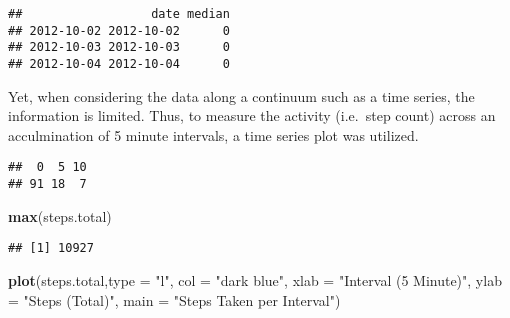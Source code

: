 \documentclass[]{article}
\newenvironment{Shaded}{\begin{snugshade}}{\end{snugshade}}
\newcommand{\KeywordTok}[1]{\textcolor[rgb]{0.13,0.29,0.53}{\textbf{#1}}}
\newcommand{\DataTypeTok}[1]{\textcolor[rgb]{0.13,0.29,0.53}{#1}}
\newcommand{\DecValTok}[1]{\textcolor[rgb]{0.00,0.00,0.81}{#1}}
\newcommand{\StringTok}[1]{\textcolor[rgb]{0.31,0.60,0.02}{#1}}
\newcommand{\OperatorTok}[1]{\textcolor[rgb]{0.81,0.36,0.00}{\textbf{#1}}}
\newcommand{\NormalTok}[1]{#1}
\begin{document}
\begin{verbatim}
##                  date median
## 2012-10-02 2012-10-02      0
## 2012-10-03 2012-10-03      0
## 2012-10-04 2012-10-04      0
\end{verbatim}

\begin{Shaded}
\end{Shaded}

Yet, when considering the data along a continuum such as a time series,
the information is limited. Thus, to measure the activity (i.e.~step
count) across an acculmination of 5 minute intervals, a time series plot
was utilized.

\begin{Shaded}
\end{Shaded}

\begin{verbatim}
##  0  5 10 
## 91 18  7
\end{verbatim}

\begin{Shaded}
\begin{Highlighting}[]
\KeywordTok{max}\NormalTok{(steps.total)}
\end{Highlighting}
\end{Shaded}

\begin{verbatim}
## [1] 10927
\end{verbatim}

\begin{Shaded}
\begin{Highlighting}[]
\KeywordTok{plot}\NormalTok{(steps.total,}\DataTypeTok{type  =} \StringTok{"l"}\NormalTok{, }\DataTypeTok{col =} \StringTok{"dark blue"}\NormalTok{, }\DataTypeTok{xlab =} \StringTok{"Interval (5 Minute)"}\NormalTok{, }\DataTypeTok{ylab =} \StringTok{"Steps (Total)"}\NormalTok{, }\DataTypeTok{main =} \StringTok{"Steps Taken per Interval"}\NormalTok{)}
\end{Highlighting}
\end{Shaded}
\end{document}
